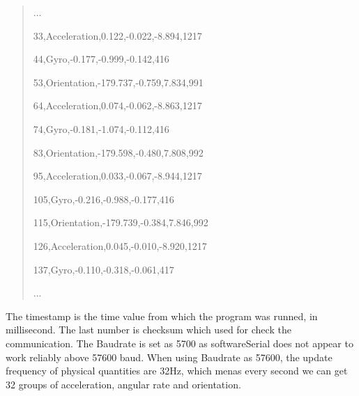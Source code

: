 \begin{quote}
\centering
...

33,Acceleration,0.122,-0.022,-8.894,1217

44,Gyro,-0.177,-0.999,-0.142,416

53,Orientation,-179.737,-0.759,7.834,991

64,Acceleration,0.074,-0.062,-8.863,1217

74,Gyro,-0.181,-1.074,-0.112,416

83,Orientation,-179.598,-0.480,7.808,992

95,Acceleration,0.033,-0.067,-8.944,1217

105,Gyro,-0.216,-0.988,-0.177,416

115,Orientation,-179.739,-0.384,7.846,992

126,Acceleration,0.045,-0.010,-8.920,1217

137,Gyro,-0.110,-0.318,-0.061,417

...
\end{quote}

The timestamp is the time value from which the program was runned, in millisecond. The last number is checksum which used for check the communication.
The Baudrate is set as 5700 as softwareSerial does not appear to work reliably above 57600 baud.\cite{https://github.com/ArduSat/ArdusatSDK}
When using Baudrate as 57600, the update frequency of physical quantities are 32Hz, which menas every second we can get 32 groups of acceleration, angular rate and orientation.


